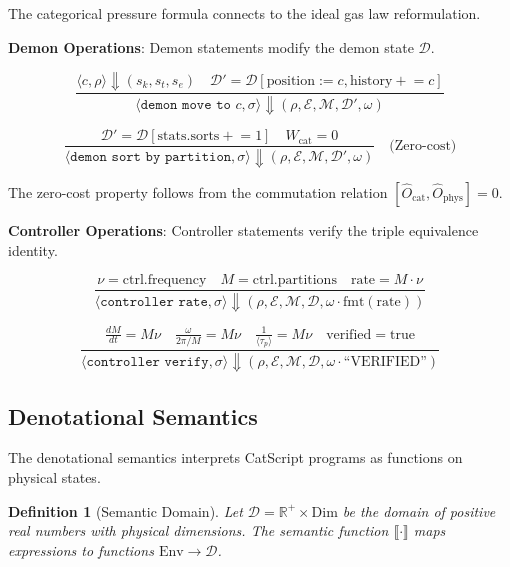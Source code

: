 \documentclass[twocolumn,10pt]{article}
\newtheorem{definition}[theorem]{Definition}
\begin{document}
The categorical pressure formula connects to the ideal gas law reformulation.

\textbf{Demon Operations}: Demon statements modify the demon state $\mathcal{D}$.

\begin{equation}
    \frac{\langle c, \rho \rangle \Downarrow (s_k, s_t, s_e) \quad \mathcal{D}' = \mathcal{D}[\text{position} := c, \text{history} \mathrel{+}= c]}{\langle \texttt{demon move to } c, \sigma \rangle \Downarrow (\rho, \mathcal{E}, \mathcal{M}, \mathcal{D}', \omega)}
\end{equation}

\begin{equation}
    \frac{\mathcal{D}' = \mathcal{D}[\text{stats.sorts} \mathrel{+}= 1] \quad W_{\text{cat}} = 0}{\langle \texttt{demon sort by partition}, \sigma \rangle \Downarrow (\rho, \mathcal{E}, \mathcal{M}, \mathcal{D}', \omega)}
    \quad \text{(Zero-cost)}
\end{equation}

The zero-cost property follows from the commutation relation $[\hat{O}_{\text{cat}}, \hat{O}_{\text{phys}}] = 0$.

\textbf{Controller Operations}: Controller statements verify the triple equivalence identity.

\begin{equation}
    \frac{\nu = \text{ctrl.frequency} \quad M = \text{ctrl.partitions} \quad \text{rate} = M \cdot \nu}{\langle \texttt{controller rate}, \sigma \rangle \Downarrow (\rho, \mathcal{E}, \mathcal{M}, \mathcal{D}, \omega \cdot \text{fmt}(\text{rate}))}
\end{equation}

\begin{equation}
    \frac{\frac{dM}{dt} = M\nu \quad \frac{\omega}{2\pi/M} = M\nu \quad \frac{1}{\langle\tau_p\rangle} = M\nu \quad \text{verified} = \text{true}}{\langle \texttt{controller verify}, \sigma \rangle \Downarrow (\rho, \mathcal{E}, \mathcal{M}, \mathcal{D}, \omega \cdot \text{``VERIFIED''})}
\end{equation}

\subsection{Denotational Semantics}

The denotational semantics interprets CatScript programs as functions on physical states.

\begin{definition}[Semantic Domain]
Let $\mathcal{D} = \mathbb{R}^+ \times \text{Dim}$ be the domain of positive real numbers with physical dimensions. The semantic function $\llbracket \cdot \rrbracket$ maps expressions to functions $\text{Env} \to \mathcal{D}$.
\end{definition}
\end{document}

